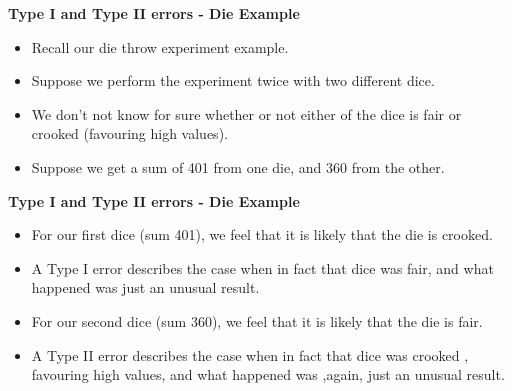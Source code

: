 
\noindent \textbf{Type I and Type II errors - Die Example}
\begin{itemize}
\item Recall our die throw experiment example.
\item Suppose we perform the experiment twice with two different dice.
\item We don't not know for sure whether or not either of the dice is fair or crooked (favouring high values).
\item Suppose we get a sum of 401 from one die, and 360 from the other.
\end{itemize}



\noindent \textbf{Type I and Type II errors - Die Example}
\begin{itemize}
\item For our first dice (sum 401), we feel that it is likely that the die is crooked.
\item A Type I error describes the case when in fact that dice was fair, and what happened was just an unusual result.
\item For our second dice (sum 360), we feel that it is likely that the die is fair.
\item A Type II error describes the case when in fact that dice was crooked , favouring high values, and what happened was ,again, just an unusual result.
\end{itemize}






 
